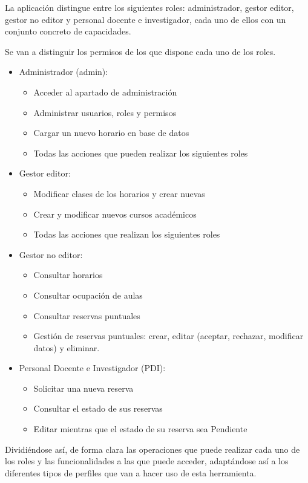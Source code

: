 La aplicación distingue entre los siguientes roles: administrador, gestor editor, gestor no editor y personal docente e investigador, cada uno de ellos con un conjunto concreto de capacidades.

Se van a distinguir los permisos de los que dispone cada uno de los roles.
\begin{itemize}
	\item Administrador (admin):
	\begin{itemize}
		\item Acceder al apartado de administración
		\item Administrar usuarios, roles y permisos
		\item Cargar un nuevo horario en base de datos
		\item Todas las acciones que pueden realizar los siguientes roles
	\end{itemize}
	\item Gestor editor:
	\begin{itemize}
		\item Modificar clases de los horarios y crear nuevas
		\item Crear y modificar nuevos cursos académicos
		\item Todas las acciones que realizan los siguientes roles
	\end{itemize}
	\item Gestor no editor:
	\begin{itemize}
		\item Consultar horarios
		\item Consultar ocupación de aulas
		\item Consultar reservas puntuales
		\item Gestión de reservas puntuales: crear, editar (aceptar, rechazar, modificar datos) y eliminar.
	\end{itemize}
	\item Personal Docente e Investigador (PDI):
	\begin{itemize}
		\item Solicitar una nueva reserva
		\item Consultar el estado de sus reservas
		\item Editar mientras que el estado de su reserva sea Pendiente
	\end{itemize}
\end{itemize}

Dividiéndose así, de forma clara las operaciones que puede realizar cada uno de los roles y las funcionalidades a las que puede acceder, adaptándose así a los diferentes tipos de perfiles que van a hacer uso de esta herramienta.



